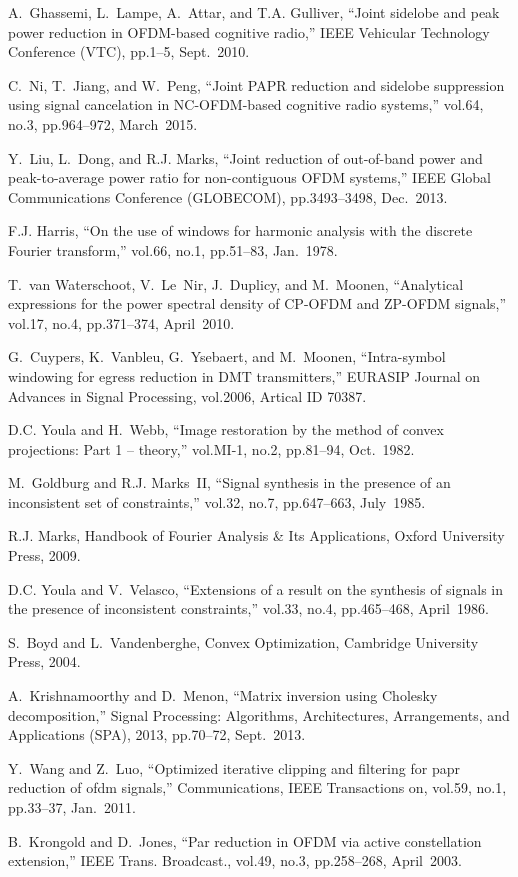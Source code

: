 \documentclass[paper]{ieice}
\begin{document}
\begin{thebibliography}{10}
A.~Ghassemi, L.~Lampe, A.~Attar, and T.A. Gulliver, ``Joint sidelobe and peak
  power reduction in {OFDM}-based cognitive radio,'' IEEE Vehicular Technology
  Conference (VTC), pp.1--5, Sept.\ 2010.

C.~Ni, T.~Jiang, and W.~Peng, ``Joint {PAPR} reduction and sidelobe suppression
  using signal cancelation in {NC-OFDM-based} cognitive radio systems,''
  vol.64, no.3, pp.964--972, March\ 2015.

Y.~Liu, L.~Dong, and R.J. Marks, ``Joint reduction of out-of-band power and
  peak-to-average power ratio for non-contiguous {OFDM} systems,'' IEEE Global
  Communications Conference (GLOBECOM), pp.3493--3498, Dec.\ 2013.

F.J. Harris, ``On the use of windows for harmonic analysis with the discrete
  {F}ourier transform,'' vol.66, no.1, pp.51--83, Jan.\ 1978.

T.~van Waterschoot, V.~Le~Nir, J.~Duplicy, and M.~Moonen, ``Analytical
  expressions for the power spectral density of {CP-OFDM} and {ZP-OFDM}
  signals,'' vol.17, no.4, pp.371--374, April\ 2010.

G.~Cuypers, K.~Vanbleu, G.~Ysebaert, and M.~Moonen, ``Intra-symbol windowing
  for egress reduction in {DMT} transmitters,'' EURASIP Journal on Advances in
  Signal Processing, vol.2006, Artical ID 70387.

D.C. Youla and H.~Webb, ``Image restoration by the method of convex
  projections: Part 1 -- theory,'' vol.MI-1, no.2, pp.81--94, Oct.\ 1982.

M.~Goldburg and R.J. Marks~II, ``Signal synthesis in the presence of an
  inconsistent set of constraints,'' vol.32, no.7, pp.647--663, July\ 1985.

R.J. Marks, Handbook of Fourier Analysis \& Its Applications, Oxford University
  Press, 2009.

D.C. Youla and V.~Velasco, ``Extensions of a result on the synthesis of signals
  in the presence of inconsistent constraints,'' vol.33, no.4, pp.465--468,
  April\ 1986.

S.~Boyd and L.~Vandenberghe, Convex Optimization, Cambridge University Press,
  2004.

A.~Krishnamoorthy and D.~Menon, ``Matrix inversion using {C}holesky
  decomposition,'' Signal Processing: Algorithms, Architectures, Arrangements,
  and Applications (SPA), 2013, pp.70--72, Sept.\ 2013.

Y.~Wang and Z.~Luo, ``Optimized iterative clipping and filtering for papr
  reduction of ofdm signals,'' Communications, IEEE Transactions on, vol.59,
  no.1, pp.33--37, Jan.\ 2011.

B.~Krongold and D.~Jones, ``Par reduction in {OFDM} via active constellation
  extension,'' {IEEE} Trans. Broadcast., vol.49, no.3, pp.258--268, April\
  2003.

\end{thebibliography}
\end{document}
